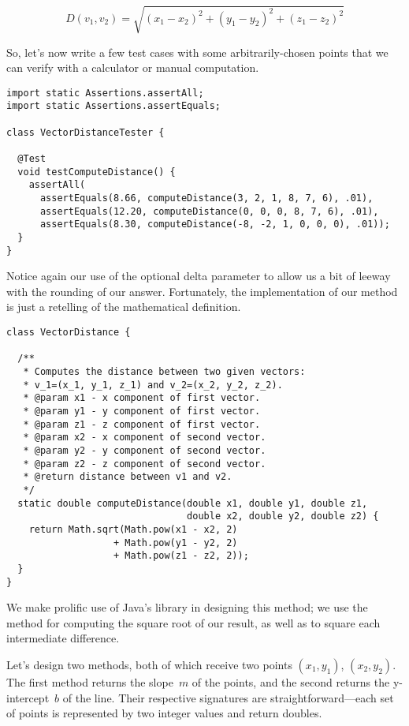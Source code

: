 \[
D(v_1, v_2) = \sqrt{(x_1 - x_2)^2 + (y_1 - y_2)^2 + (z_1 - z_2)^2}
\]

So, let's now write a few test cases with some arbitrarily-chosen points that we can verify with a calculator or manual computation.

\begin{lstlisting}[language=MyJava]
import static Assertions.assertAll;
import static Assertions.assertEquals;

class VectorDistanceTester {

  @Test
  void testComputeDistance() {
    assertAll(
      assertEquals(8.66, computeDistance(3, 2, 1, 8, 7, 6), .01),
      assertEquals(12.20, computeDistance(0, 0, 0, 8, 7, 6), .01),
      assertEquals(8.30, computeDistance(-8, -2, 1, 0, 0, 0), .01));
  }
}
\end{lstlisting}

Notice again our use of the optional delta parameter to allow us a bit of leeway with the rounding of our answer. 
Fortunately, the implementation of our method is just a retelling of the mathematical definition.

\begin{lstlisting}[language=MyJava]
class VectorDistance {

  /**
   * Computes the distance between two given vectors:
   * v_1=(x_1, y_1, z_1) and v_2=(x_2, y_2, z_2).
   * @param x1 - x component of first vector.
   * @param y1 - y component of first vector.
   * @param z1 - z component of first vector.
   * @param x2 - x component of second vector.
   * @param y2 - y component of second vector.
   * @param z2 - z component of second vector.
   * @return distance between v1 and v2.
   */
  static double computeDistance(double x1, double y1, double z1, 
                                double x2, double y2, double z2) {
    return Math.sqrt(Math.pow(x1 - x2, 2) 
                   + Math.pow(y1 - y2, 2)
                   + Math.pow(z1 - z2, 2));
  }
}
\end{lstlisting}

We make prolific use of Java's  library in designing this method; we use the  method for computing the square root of our result, as well as  to square each intermediate difference.

Let's design two methods, both of which receive two points $(x_1, y_1)$, $(x_2, y_2)$. 
The first method returns the slope~$m$ of the points, and the second returns the y-intercept~$b$ of the line. 
Their respective signatures are straightforward---each set of points is represented by two integer values and return doubles.

